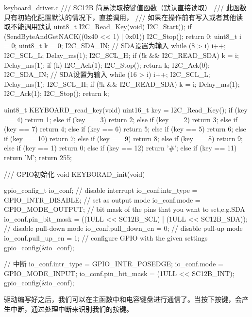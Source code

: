 \documentclass[lang=cn,newtx,10pt,scheme=chinese]{elegantbook}
\begin{document}
\begin{mycode}{keyboard\_driver.c}
/// SC12B 简易读取按键值函数（默认直接读取）
/// 此函数只有初始化配置默认的情况下，直接调用，
/// 如果在操作前有写入或者其他读取不能调用默认
uint8_t I2C_Read_Key(void)
{
    I2C_Start();
    if (SendByteAndGetNACK((0x40 << 1) | 0x01))
    {
        I2C_Stop();
        return 0;
    }
    uint8_t i = 0;
    uint8_t k = 0;
    I2C_SDA_IN; // SDA设置为输入
    while (8 > i)
    {
        i++;
        I2C_SCL_L;
        Delay_ms(1);
        I2C_SCL_H;
        if (!k && I2C_READ_SDA)
        {
            k = i;
        }
        Delay_ms(1);
    }
    if (k)
    {
        I2C_Ack(1);
        I2C_Stop();
        return k;
    }
    I2C_Ack(0);
    I2C_SDA_IN; // SDA设置为输入
    while (16 > i)
    {
        i++;
        I2C_SCL_L;
        Delay_ms(1);
        I2C_SCL_H;
        if (!k && I2C_READ_SDA)
        {
            k = i;
        }
        Delay_ms(1);
    }
    I2C_Ack(1);
    I2C_Stop();
    return k;
}

uint8_t KEYBOARD_read_key(void)
{
    uint16_t key = I2C_Read_Key();
    if (key == 4)
    {
        return 1;
    }
    else if (key == 3)
    {
        return 2;
    }
    else if (key == 2)
    {
        return 3;
    }
    else if (key == 7)
    {
        return 4;
    }
    else if (key == 6)
    {
        return 5;
    }
    else if (key == 5)
    {
        return 6;
    }
    else if (key == 10)
    {
        return 7;
    }
    else if (key == 9)
    {
        return 8;
    }
    else if (key == 8)
    {
        return 9;
    }
    else if (key == 1)
    {
        return 0;
    }
    else if (key == 12)
    {
        return '#';
    }
    else if (key == 11)
    {
        return 'M';
    }
    return 255;
}

/// GPIO初始化
void KEYBORAD_init(void)
{
    gpio_config_t io_conf;
    // disable interrupt
    io_conf.intr_type = GPIO_INTR_DISABLE;
    // set as output mode
    io_conf.mode = GPIO_MODE_OUTPUT;
    // bit mask of the pins that you want to set,e.g.SDA
    io_conf.pin_bit_mask = ((1ULL << SC12B_SCL) | (1ULL << SC12B_SDA));
    // disable pull-down mode
    io_conf.pull_down_en = 0;
    // disable pull-up mode
    io_conf.pull_up_en = 1;
    // configure GPIO with the given settings
    gpio_config(&io_conf);

    // 中断
    io_conf.intr_type = GPIO_INTR_POSEDGE;
    io_conf.mode = GPIO_MODE_INPUT;
    io_conf.pin_bit_mask = (1ULL << SC12B_INT);
    gpio_config(&io_conf);
}
\end{mycode}

驱动编写好之后，我们可以在主函数中和电容键盘进行通信了。当按下按键，会产生中断，通过处理中断来识别我们的按键。
\end{document}
